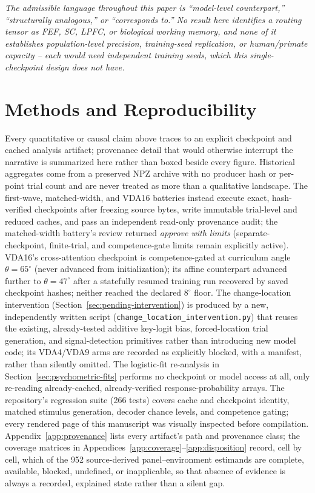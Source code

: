 \documentclass[10pt]{article}
\newcommand{\note}[1]{\textcolor{NoteGray}{\textit{#1}}}
\begin{document}
\note{The admissible language throughout this paper is ``model-level counterpart,'' ``structurally analogous,'' or ``corresponds to.'' No result here identifies a routing tensor as FEF, SC, LPFC, or biological working memory, and none of it establishes population-level precision, training-seed replication, or human/primate capacity -- each would need independent training seeds, which this single-checkpoint design does not have.}

\FloatBarrier
\section{Methods and Reproducibility}\label{sec:methods}
Every quantitative or causal claim above traces to an explicit checkpoint and cached analysis artifact; provenance detail that would otherwise interrupt the narrative is summarized here rather than boxed beside every figure. Historical aggregates come from a preserved NPZ archive with no producer hash or per-point trial count and are never treated as more than a qualitative landscape. The first-wave, matched-width, and VDA16 batteries instead execute exact, hash-verified checkpoints after freezing source bytes, write immutable trial-level and reduced caches, and pass an independent read-only provenance audit; the matched-width battery's review returned \emph{approve with limits} (separate-checkpoint, finite-trial, and competence-gate limits remain explicitly active). VDA16's cross-attention checkpoint is competence-gated at curriculum angle $\theta=65^\circ$ (never advanced from initialization); its affine counterpart advanced further to $\theta=47^\circ$ after a statefully resumed training run recovered by saved checkpoint hashes; neither reached the declared $8^\circ$ floor. The change-location intervention (Section~\ref{sec:pending-intervention}) is produced by a new, independently written script (\texttt{change\_location\_intervention.py}) that reuses the existing, already-tested additive key-logit bias, forced-location trial generation, and signal-detection primitives rather than introducing new model code; its VDA4/VDA9 arms are recorded as explicitly blocked, with a manifest, rather than silently omitted. The logistic-fit re-analysis in Section~\ref{sec:psychometric-fits} performs no checkpoint or model access at all, only re-reading already-cached, already-verified response-probability arrays. The repository's regression suite (266 tests) covers cache and checkpoint identity, matched stimulus generation, decoder chance levels, and competence gating; every rendered page of this manuscript was visually inspected before compilation. Appendix~\ref{app:provenance} lists every artifact's path and provenance class; the coverage matrices in Appendices~\ref{app:coverage}--\ref{app:disposition} record, cell by cell, which of the 952 source-derived panel--environment estimands are complete, available, blocked, undefined, or inapplicable, so that absence of evidence is always a recorded, explained state rather than a silent gap.
\end{document}

